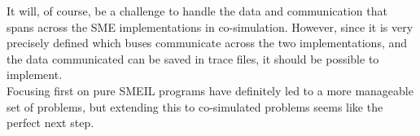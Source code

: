 
It will, of course, be a challenge to handle the data and communication that spans across the SME implementations in co-simulation. However, since it is very precisely defined which buses communicate across the two implementations, and the data communicated can be saved in trace files, it should be possible to implement.\\

Focusing first on pure SMEIL programs have definitely led to a more manageable set of problems, but extending this to co-simulated problems seems like the perfect next step.

